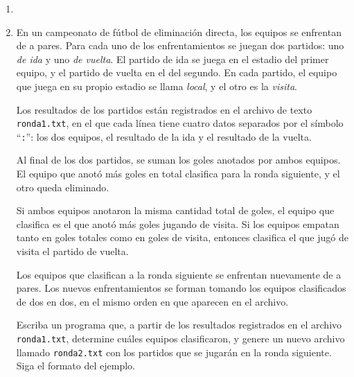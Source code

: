 \documentclass[11pt,spanish]{article}
\newcommand{\pond}[1]{[{\small\textbf{#1\%}}]}
\begin{document}
  \begin{enumerate}[font=\Large\bfseries]



    \newpage
    \item
      \pond{33\(\frac{1}{3}\)\!}

    \newpage
    \item
      \pond{33\(\frac{1}{3}\)\!}
      En un campeonato de fútbol de eliminación directa, los equipos se enfrentan de a pares.
      Para cada uno de los enfrentamientos se juegan dos partidos:
      uno \emph{de ida} y uno \emph{de vuelta}.
      El partido de ida se juega en el estadio del primer equipo,
      y el partido de vuelta en el del segundo.
      En cada partido, el equipo que juega en su propio estadio se llama \emph{local},
      y el otro es la \emph{visita}.

      Los resultados de los partidos están registrados en el archivo de texto \texttt{ronda1.txt},
      en el que cada línea tiene cuatro datos separados por el símbolo ``\verb+:+'':
      los dos equipos, el resultado de la ida y el resultado de la vuelta.

      Al final de los dos partidos,
      se suman los goles anotados por ambos equipos.
      El equipo que anotó más goles en total clasifica para la ronda siguiente,
      y el otro queda eliminado.

      Si ambos equipos anotaron la misma cantidad total de goles,
      el equipo que clasifica es el que anotó más goles jugando de visita.
      Si los equipos empatan tanto en goles totales como en goles de visita,
      entonces clasifica el que jugó de visita el partido de vuelta.

      Los equipos que clasifican a la ronda siguiente se enfrentan nuevamente de a pares.
      Los nuevos enfrentamientos se forman tomando los equipos clasificados de dos en dos,
      en el mismo orden en que aparecen en el archivo.

      Escriba un programa que,
      a partir de los resultados registrados en el archivo \texttt{ronda1.txt},
      determine cuáles equipos clasificaron,
      y genere un nuevo archivo llamado \texttt{ronda2.txt}
      con los partidos que se jugarán en la ronda siguiente.
      Siga el formato del ejemplo.


\end{enumerate}
\end{document}
